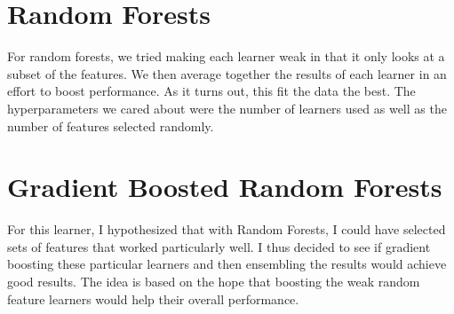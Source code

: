 \documentclass[twoside,11pt]{article}
\theoremstyle{definition}
\begin{document}
\section*{Random Forests}

For random forests, we tried making each learner weak in that it only looks at a subset of the features. We then average together the results of each learner in an effort to boost performance. As it turns out, this fit the data the best. The hyperparameters we cared about were the number of learners used as well as the number of features selected randomly. 

\section*{Gradient Boosted Random Forests}

For this learner, I hypothesized that with Random Forests, I could have selected sets of features that worked particularly well. I thus decided to see if gradient boosting these particular learners and then ensembling the results would achieve good results. The idea is based on the hope that boosting the weak random feature learners would help their overall performance. 
\end{document}
